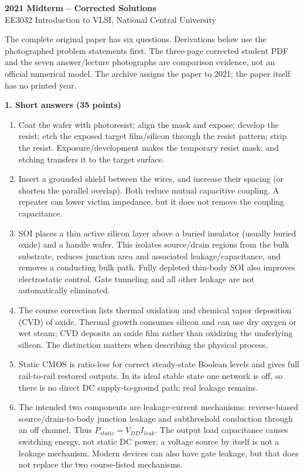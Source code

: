 \documentclass[10pt]{article}
\begin{document}
\begin{center}{\Large\bfseries 2021 Midterm -- Corrected Solutions}\\[3pt]EE3032 Introduction to VLSI, National Central University\end{center}
The complete original paper has six questions. Derivations below use the photographed problem statements first. The three-page corrected student PDF and the seven answer/lecture photographs are comparison evidence, not an official numerical model. The archive assigns the paper to 2021; the paper itself has no printed year.

\textbf{1. Short answers (35 points)}
\begin{enumerate}[label=(\alph*),leftmargin=7mm,itemsep=6pt]
\item Coat the wafer with photoresist; align the mask and expose; develop the resist; etch the exposed target film/silicon through the resist pattern; strip the resist. Exposure/development makes the temporary resist mask, and etching transfers it to the target surface.
\item Insert a grounded shield between the wires, and increase their spacing (or shorten the parallel overlap). Both reduce mutual capacitive coupling. A repeater can lower victim impedance, but it does not remove the coupling capacitance.
\item SOI places a thin active silicon layer above a buried insulator (usually buried oxide) and a handle wafer. This isolates source/drain regions from the bulk substrate, reduces junction area and associated leakage/capacitance, and removes a conducting bulk path. Fully depleted thin-body SOI also improves electrostatic control. Gate tunneling and all other leakage are not automatically eliminated.
\item The course correction lists thermal oxidation and chemical vapor deposition (CVD) of oxide. Thermal growth consumes silicon and can use dry oxygen or wet steam; CVD deposits an oxide film rather than oxidizing the underlying silicon. The distinction matters when describing the physical process.
\item Static CMOS is ratio-less for correct steady-state Boolean levels and gives full rail-to-rail restored outputs. In its ideal stable state one network is off, so there is no direct DC supply-to-ground path; real leakage remains.
\item The intended two components are leakage-current mechanisms: reverse-biased source/drain-to-body junction leakage and subthreshold conduction through an off channel. Thus $P_{static}=V_{DD}I_{leak}$. The output load capacitance causes switching energy, not static DC power; a voltage source by itself is not a leakage mechanism. Modern devices can also have gate leakage, but that does not replace the two course-listed mechanisms.

\end{enumerate}
\end{document}
